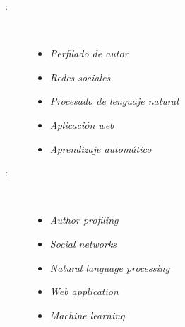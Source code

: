 \newpage
\begin{multicols}{2}
\begin{description}
\item [\palabraschaveprincipal:] \mbox{} \\[-20pt]
  \begin{itemize}
    \item \textit{Perfilado de autor}
    \item \textit{Redes sociales}
    \item \textit{Procesado de lenguaje natural}
    \item \textit{Aplicación web}
    \item \textit{Aprendizaje automático}
  \end{itemize}
\end{description}

\begin{description}
\item [\palabraschavesecundaria:] \mbox{} \\[-20pt]
  \begin{itemize}
    \item \textit{Author profiling}
    \item \textit{Social networks}
    \item \textit{Natural language processing}
    \item \textit{Web application}
    \item \textit{Machine learning}
  \end{itemize}
\end{description}
\end{multicols}
